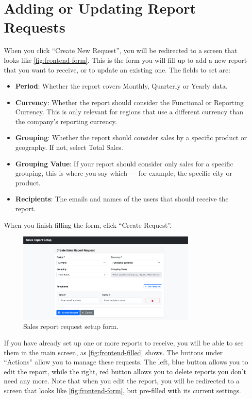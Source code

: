 \documentclass[a4paper]{report}
\begin{document}
\section{Adding or Updating Report Requests}
\label{annex:user-manual-report-request}

When you click ``Create New Request'', you will be redirected to a screen that looks like \autoref{fig:frontend-form}. This is the form you will fill up to add a new report that you want to receive, or to update an existing one. The fields to set are:

\begin{itemize}
    \item \textbf{Period}: Whether the report covers Monthly, Quarterly or Yearly data.
    \item \textbf{Currency}: Whether the report should consider the Functional or Reporting Currency. This is only relevant for regions that use a different currency than the company's reporting currency.
    \item \textbf{Grouping}: Whether the report should consider sales by a specific product or geography. If not, select Total Sales.
    \item \textbf{Grouping Value}: If your report should consider only sales for a specific grouping, this is where you say which --- for example, the specific city or product.
    \item \textbf{Recipients}: The emails and names of the users that should receive the report.
\end{itemize}

When you finish filling the form, click ``Create Request''.

\begin{figure}[h]
\centering
\includegraphics[width=0.8\textwidth]{images/frontend-form.png}
\caption{Sales report request setup form.}
\label{fig:frontend-form}
\end{figure}

If you have already set up one or more reports to receive, you will be able to see them in the main screen, as \autoref{fig:frontend-filled} shows. The buttons under ``Actions'' allow you to manage these requests. The left, blue button allows you to edit the report, while the right, red button allows you to delete reports you don't need any more. Note that when you edit the report, you will be redirected to a screen that looks like \autoref{fig:frontend-form}, but pre-filled with its current settings.
\end{document}
